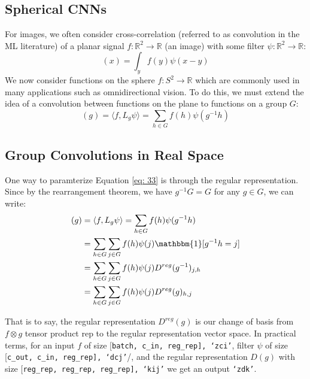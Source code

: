 \documentclass[9pt]{article}
\begin{document}
\begin{multicols}{2}
\subsection{Spherical CNNs}

For images, we often consider cross-correlation (referred
to as convolution in the ML literature) of a planar 
signal $f: \mathbb{R}^2 \to \mathbb{R}$ (an image) with
some filter $\psi: \mathbb{R}^2 \to \mathbb{R}$:
\begin{equation}
    [f \star \psi](x) = \int_{y}f(y)
    \psi(x-y)
\end{equation}
We now consider functions on the sphere $f: S^2 \to \mathbb{R}$ which are commonly used in many applications 
such as omnidirectional vision. To do this, we must extend the idea of
a convolution between functions on the plane to functions on a group $G$:
\begin{equation}
    [f \star \psi] (g) = \langle f, L_g \psi  \rangle = \sum_{h \in G} f(h)\psi(g^{-1}h)
    \label{eq: 33}
\end{equation}

\subsection{Group Convolutions in Real Space}

One way to paramterize Equation \ref{eq: 33} is through the regular
representation. Since by the rearrangement theorem, we have $g^{-1}G = G$
for any $g \in G$, we can write:
\begin{align}
    [f \star \psi] (g) &= \langle f, L_g \psi  \rangle = \sum_{h \in G} f(h)\psi(g^{-1}h) \\ &= \sum_{h \in G} \sum_{j \in G}f(h)\psi(j)
    \mathbbm{1}[g^{-1}h = j] \\
    &= \sum_{h \in G}\sum_{j \in G}f(h)\psi(j)D^{reg}(g^{-1})_{j,h} \\
    &= \sum_{h \in G}\sum_{j \in G}f(h)\psi(j)D^{reg}(g)_{h,j}
\end{align}

That is to say, the regular representation $D^{reg}(g)$ is our change
of basis from $f \otimes g$ tensor product rep to the regular 
representation vector space. In practical terms, for an input $f$
of size [\texttt{batch, c\_in, reg\_rep], `zci'}, filter $\psi$ of size
[\texttt{c\_out, c\_in, reg\_rep], `dcj'}/, and the regular representation 
$D(g)$ with size [\texttt{reg\_rep, reg\_rep, reg\_rep], `kij'} we get an output \texttt{`zdk'}. 


\end{multicols}
\end{document}

